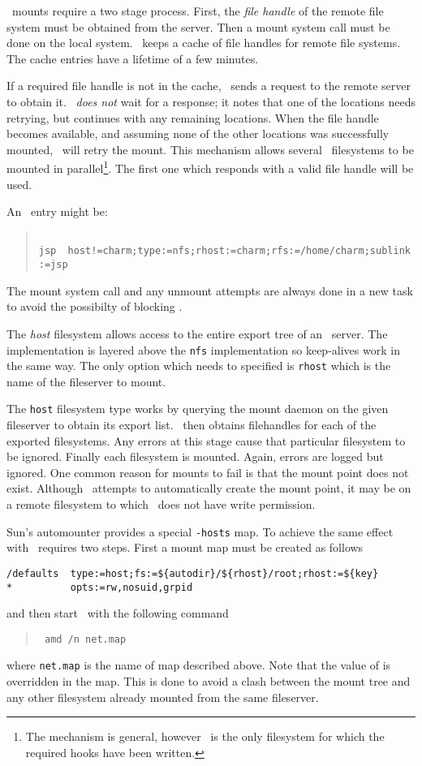 \NFS\ mounts require a two stage process.  First, the {\em file handle} of
the remote file system must be obtained from the server.  Then a mount
system call must be done on the local system.
\Amd\ keeps a cache of file handles for remote file systems.  The cache
entries have a lifetime of a few minutes.

If a required file handle is not in the cache, \amd\ sends a request
to the remote server to obtain it.  \Amd\ {\em does not} wait for
a response; it notes that one of the locations needs retrying, but
continues with any remaining locations.  When the file handle becomes
available, and assuming none of the other locations was successfully
mounted, \amd\ will retry the mount.  This mechanism allows several
\NFS\ filesystems to be mounted in parallel\footnote{The mechanism
is general, however \NFS\ is the only filesystem
for which the required hooks have been written.}.
The first one which
responds with a valid file handle will be used.

An \NFS\ entry might be:
\begin{quote}
\tt
jsp\ \ host!=charm;type:=nfs;rhost:=charm;rfs:=/home/charm;sublink:=jsp
\end{quote}

The mount system call and any unmount attempts are always done
in a new task to avoid the possibilty of blocking \amd.


The {\em host} filesystem allows access to the entire export tree of
an \NFS\ server.  The implementation is layered above the {\tt nfs} implementation
so keep-alives work in the same way.
The only option which needs to specified is {\tt rhost} which is the name
of the fileserver to mount.

The {\tt host} filesystem type works by querying the mount daemon on the
given fileserver to obtain its export list.  \Amd\ then obtains filehandles
for each of the exported filesystems.  Any errors at this stage cause that
particular filesystem to be ignored.  Finally each filesystem is mounted.
Again, errors are logged but ignored.  One common reason for mounts to fail
is that the mount point does not exist.  Although \amd\ attempts to
automatically create the mount point, it may be on a remote filesystem
to which \amd\ does not have write permission.

Sun's automounter provides a special {\tt -hosts} map.  To achieve the same
effect with \amd\ requires two steps.  First a mount map must be created as
follows
\begin{verbatim}
/defaults  type:=host;fs:=${autodir}/${rhost}/root;rhost:=${key}
*          opts:=rw,nosuid,grpid
\end{verbatim}
and then start \amd\ with the following command
\begin{quote}
\tt
amd /n net.map
\end{quote}
where {\tt net.map} is the name of map described above.
Note that the value of  is overridden in the map.  This is done to
avoid a clash between the mount tree and any other filesystem already
mounted from the same fileserver.

